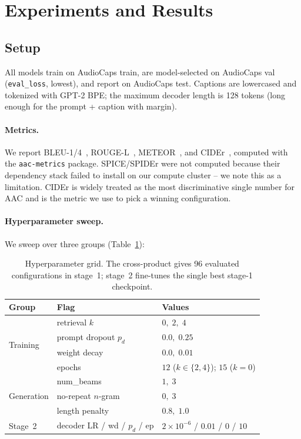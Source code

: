 \documentclass[10pt,twocolumn,letterpaper]{article}
\begin{document}
\section{Experiments and Results}

\subsection{Setup}
All models train on AudioCaps train, are model-selected on AudioCaps val
(\texttt{eval\_loss}, lowest), and report on AudioCaps test. Captions are
lowercased and tokenized with GPT-2 BPE; the maximum decoder length is 128
tokens (long enough for the prompt + caption with margin).

\paragraph{Metrics.}
We report BLEU-1/4~\cite{papineni2002bleu}, ROUGE-L~\cite{lin2004rouge},
METEOR~\cite{banerjee2005meteor}, and CIDEr~\cite{vedantam2015cider}, computed
with the \texttt{aac-metrics} package. SPICE/SPIDEr were not computed because
their dependency stack failed to install on our compute cluster -- we note
this as a limitation. CIDEr is widely treated as the most discriminative
single number for AAC and is the metric we use to pick a winning configuration.

\paragraph{Hyperparameter sweep.}
We sweep over three groups (Table~\ref{tab:hp}):

\begin{table}[t]
\centering\small
\setlength{\tabcolsep}{4pt}
\begin{tabular}{lll}
\toprule
\textbf{Group} & \textbf{Flag} & \textbf{Values} \\
\midrule
\multirow{4}{*}{Training}
 & retrieval $k$        & $0,\;2,\;4$ \\
 & prompt dropout $p_d$ & $0.0,\;0.25$ \\
 & weight decay         & $0.0,\;0.01$ \\
 & epochs               & $12$ ($k\in\{2,4\}$); $15$ ($k{=}0$) \\
\midrule
\multirow{3}{*}{Generation}
 & num\_beams           & $1,\;3$ \\
 & no-repeat $n$-gram   & $0,\;3$ \\
 & length penalty       & $0.8,\;1.0$ \\
\midrule
Stage~2 & decoder LR / wd / $p_d$ / ep & $2{\times}10^{-6}$ / $0.01$ / $0$ / $10$ \\
\bottomrule
\end{tabular}
\caption{Hyperparameter grid. The cross-product gives 96 evaluated
configurations in stage~1; stage~2 fine-tunes the single best stage-1
checkpoint.}
\label{tab:hp}
\end{table}
\end{document}
